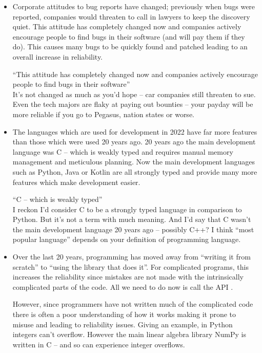\documentclass[10pt,\jkfside,a4paper]{article}
\begin{document}
\begin{enumerate}
\begin{itemize}
\item Corporate attitudes to bug reports have changed; previously when bugs
were reported, companies would threaten to call in lawyers to keep the
discovery quiet. This attitude has completely changed now and companies
actively encourage people to find bugs in their software (and will pay
them if they do). This causes many bugs to be quickly found and patched
leading to an overall increase in reliability.

{\color{blue}
``This attitude has completely changed now and companies actively encourage
people to find bugs in their software''\\
It's not changed as much as you'd hope -- car companies still threaten to sue.
Even the tech majors are flaky at paying out bounties -- your payday will be more
reliable if you go to Pegasus, nation states or worse.
}

\item The languages which are used for development in 2022 have far more
features than those which were used 20 years ago. 20 years ago the main
development language was C -- which is weakly typed and requires manual
memory management and meticulous planning. Now the main development languages
such as Python, Java or Kotlin are all strongly typed and provide many more
features which make development easier.

{\color{blue}
``C -- which is weakly typed''\\
I reckon I'd consider C to be a strongly typed language in comparison to Python.
But it's not a term with much meaning. And I'd say that C wasn't the main
development language 20 years ago -- possibly C++? I think ``most popular
language'' depends on your definition of programming language.
}

\item Over the last 20 years, programming has moved away from ``writing it
from scratch'' to ``using the library that does it''. For complicated programs,
this increases the reliability since mistakes are not made with the
intrinsically complicated parts of the code. All we need to do now is
call the API .

However, since programmers have not written much of the complicated code there
is often a poor understanding of how it works making it prone to misuse and
leading to reliability issues. Giving an example, in Python integers can't
overflow. However the main linear algebra library NumPy is written in C -- and
so can experience integer overflows.


\end{itemize}
\end{enumerate}
\end{document}
